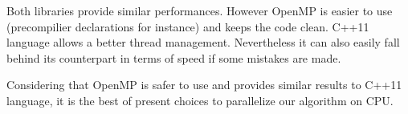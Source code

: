 Both libraries provide similar performances\cite{OpenMP_vs_CC}. However OpenMP is easier to use (precompilier declarations for instance) and keeps the code clean\cite{OpenMp_vs_explicit_threading}. C++11 language allows a better thread management. Nevertheless it can also easily fall behind its counterpart in terms of speed if some mistakes are made.

Considering that OpenMP is safer to use and provides similar results to C++11 language, it is the best of present choices to parallelize our algorithm on CPU.
